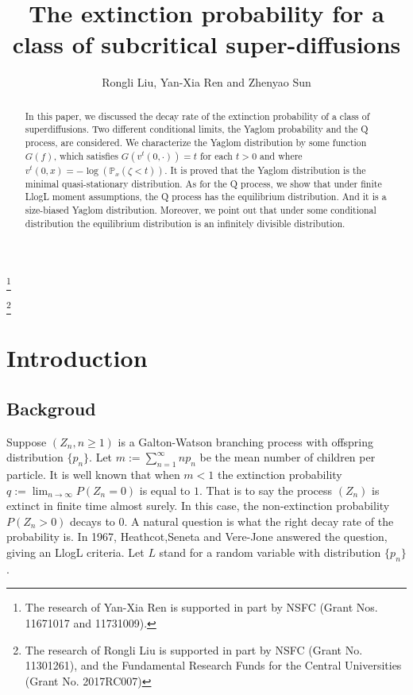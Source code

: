 \documentclass[12pt,a4paper]{amsart}
\numberwithin{equation}{section}
\theoremstyle{plain}
\theoremstyle{definition}
\begin{document}
\title
[Subcritical super-diffusions]
{\large The extinction probability for a class of subcritical super-diffusions}
\author
[R. Liu, Y.-X. Ren and Z. Sun]
{ Rongli Liu, Yan-Xia Ren and Zhenyao Sun}
\address
{Yan-Xia Ren\\
  School of Mathematical Sciences\\
  Peking University\\
  Beijing, P. R. China, 100871}
\thanks{The research of Yan-Xia Ren is supported in part by NSFC (Grant Nos. 11671017  and 11731009).}
\address
{Rongli Liu\\
  {\bf Information about Rongli Liu}}
\thanks{ The research of Rongli Liu is supported in part by NSFC
  (Grant No. 11301261), and the Fundamental Research Funds for the Central Universities (Grant No.  2017RC007)}
\address
{Zhenyao Sun\\
  School of Mathematical Sciences\\
  Peking University\\
  Beijing, P. R. China, 100871}
\begin{abstract}
	In this paper, we discussed the decay rate of the extinction probability of a class of superdiffusions.
  Two different conditional limits, the Yaglom probability and the Q process, are considered.
  We characterize the Yaglom distribution by some function $G(f)$, which satisfies $G(v^t(0,\cdot))=t$ for each $t>0$ and where $v^t(0,x)=-\log(\mathbb P_x(\zeta<t))$.
  It is proved that the Yaglom distribution is the minimal quasi-stationary distribution.
  As for the Q process, we show that under finite LlogL moment assumptions, the Q process has the equilibrium distribution.
  And it is a size-biased Yaglom distribution.
  Moreover, we point out that under some conditional distribution the equilibrium  distribution is an infinitely divisible distribution.
\end{abstract}
\maketitle
\section{Introduction}
\subsection{Backgroud}
Suppose $(Z_n, n\ge 1)$ is a Galton-Watson branching process with offspring distribution $\{p_n\}$.
Let $m:=\sum^{\infty}_{n=1}np_n$ be the mean number of children per particle.
It is well known that when $m<1$ the extinction probability $q:=\lim_{n\rightarrow\infty}P\left(Z_n=0\right)$ is equal to $1$.
That is to say the process $(Z_n)$ is extinct in finite time almost surely.
In this case, the non-extinction probability $P(Z_n>0)$ decays to $0$.
A natural question is what the right decay rate of the probability is.
In 1967, Heathcot,Seneta and Vere-Jone \cite{HeathcoteSenetaVere-Jones1967Refinement}
answered the question, giving an LlogL criteria.
Let $L$ stand for a random variable with distribution $\{p_n\}$.
\end{document}
